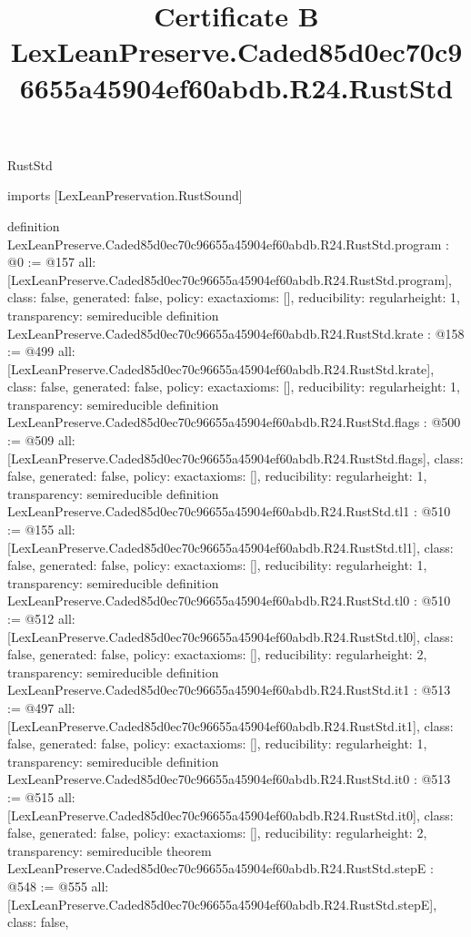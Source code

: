 \begin{lexlean}{RustStd}
\title{Certificate B LexLeanPreserve.Caded85d0ec70c96655a45904ef60abdb.R24.RustStd}
\begin{coremodule}
imports [LexLeanPreservation.RustSound]

definition LexLeanPreserve.Caded85d0ec70c96655a45904ef60abdb.R24.RustStd.program : @0 := @157 {
  all: [LexLeanPreserve.Caded85d0ec70c96655a45904ef60abdb.R24.RustStd.program],
  class: false,
  generated: false,
  policy: exact{axioms: []},
  reducibility: regular{height: 1},
  transparency: semireducible
}
definition LexLeanPreserve.Caded85d0ec70c96655a45904ef60abdb.R24.RustStd.krate : @158 := @499 {
  all: [LexLeanPreserve.Caded85d0ec70c96655a45904ef60abdb.R24.RustStd.krate],
  class: false,
  generated: false,
  policy: exact{axioms: []},
  reducibility: regular{height: 1},
  transparency: semireducible
}
definition LexLeanPreserve.Caded85d0ec70c96655a45904ef60abdb.R24.RustStd.flags : @500 := @509 {
  all: [LexLeanPreserve.Caded85d0ec70c96655a45904ef60abdb.R24.RustStd.flags],
  class: false,
  generated: false,
  policy: exact{axioms: []},
  reducibility: regular{height: 1},
  transparency: semireducible
}
definition LexLeanPreserve.Caded85d0ec70c96655a45904ef60abdb.R24.RustStd.tl1 : @510 := @155 {
  all: [LexLeanPreserve.Caded85d0ec70c96655a45904ef60abdb.R24.RustStd.tl1],
  class: false,
  generated: false,
  policy: exact{axioms: []},
  reducibility: regular{height: 1},
  transparency: semireducible
}
definition LexLeanPreserve.Caded85d0ec70c96655a45904ef60abdb.R24.RustStd.tl0 : @510 := @512 {
  all: [LexLeanPreserve.Caded85d0ec70c96655a45904ef60abdb.R24.RustStd.tl0],
  class: false,
  generated: false,
  policy: exact{axioms: []},
  reducibility: regular{height: 2},
  transparency: semireducible
}
definition LexLeanPreserve.Caded85d0ec70c96655a45904ef60abdb.R24.RustStd.it1 : @513 := @497 {
  all: [LexLeanPreserve.Caded85d0ec70c96655a45904ef60abdb.R24.RustStd.it1],
  class: false,
  generated: false,
  policy: exact{axioms: []},
  reducibility: regular{height: 1},
  transparency: semireducible
}
definition LexLeanPreserve.Caded85d0ec70c96655a45904ef60abdb.R24.RustStd.it0 : @513 := @515 {
  all: [LexLeanPreserve.Caded85d0ec70c96655a45904ef60abdb.R24.RustStd.it0],
  class: false,
  generated: false,
  policy: exact{axioms: []},
  reducibility: regular{height: 2},
  transparency: semireducible
}
theorem LexLeanPreserve.Caded85d0ec70c96655a45904ef60abdb.R24.RustStd.stepE : @548 := @555 {
  all: [LexLeanPreserve.Caded85d0ec70c96655a45904ef60abdb.R24.RustStd.stepE],
  class: false,
}
\end{coremodule}
\end{lexlean}
